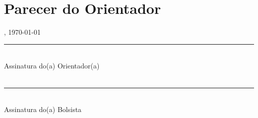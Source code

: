 \section{Parecer do Orientador}


\noindent [CIDADE], \today
\\[1.5cm]
\noindent\rule{8cm}{0.4pt}\\
Assinatura do(a) Orientador(a)\\
\\[1.5cm]
\noindent\rule{8cm}{0.4pt}\\
Assinatura do(a) Bolsista